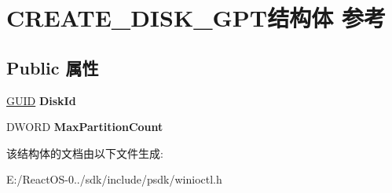 \hypertarget{struct_c_r_e_a_t_e___d_i_s_k___g_p_t}{}\section{C\+R\+E\+A\+T\+E\+\_\+\+D\+I\+S\+K\+\_\+\+G\+P\+T结构体 参考}
\label{struct_c_r_e_a_t_e___d_i_s_k___g_p_t}
\subsection*{Public 属性}
\begin{DoxyCompactItemize}
\item 
\mbox{\label{struct_c_r_e_a_t_e___d_i_s_k___g_p_t_a3da4051daa8e08aa590651ac61753797}} 
\hyperlink{interface_g_u_i_d}{G\+U\+ID} {\bfseries Disk\+Id}
\item 
\mbox{\label{struct_c_r_e_a_t_e___d_i_s_k___g_p_t_aea4e4f507a54f5b92ecbf9c322cc7d8c}} 
D\+W\+O\+RD {\bfseries Max\+Partition\+Count}
\end{DoxyCompactItemize}


该结构体的文档由以下文件生成\+:\begin{DoxyCompactItemize}
\item 
E\+:/\+React\+O\+S-\/0../sdk/include/psdk/winioctl.\+h\end{DoxyCompactItemize}
